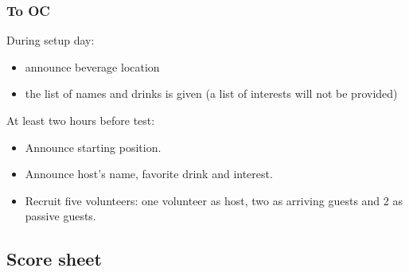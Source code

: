 \subsubsection*{To OC}


During setup day:
\begin{itemize}
	\item announce beverage location
	\item the list of names and drinks is given (a list of interests will not be provided)
\end{itemize}


At least two hours before test:
\begin{itemize}
	\item Announce starting position.
	\item Announce host's name, favorite drink and interest.
	\item Recruit five volunteers: one volunteer as host, two as arriving guests and 2 as passive guests.

\end{itemize}

\subsection*{Score sheet}
